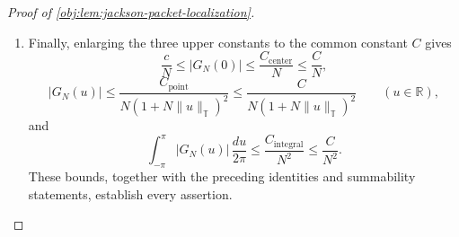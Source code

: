 \begin{proof}[Proof of \cref{obj:lem:jackson-packet-localization}]
\begin{enumerate}
\item Finally, enlarging the three upper constants to the common constant \(C\) gives
\[
\frac cN\leq|G_N(0)|
\leq\frac{C_{\mathrm{center}}}N
\leq\frac CN,
\]
\[
|G_N(u)|
\leq
\frac{C_{\mathrm{point}}}
 {N(1+N\|u\|_{\mathbb T})^2}
\leq
\frac C{N(1+N\|u\|_{\mathbb T})^2}
\qquad(u\in\mathbb R),
\]
and
\[
\int_{-\pi}^{\pi}|G_N(u)|\,\frac{du}{2\pi}
\leq\frac{C_{\mathrm{integral}}}{N^2}
\leq\frac C{N^2}.
\]
These bounds, together with the preceding identities and summability statements, establish every assertion.
\end{enumerate}
\end{proof}
